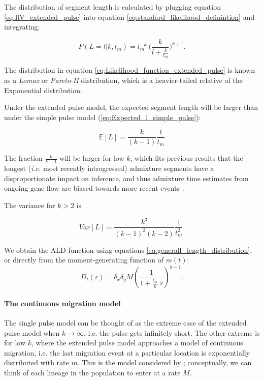 \documentclass[11pt]{article}
\let\oldparagraph\paragraph
\renewcommand{\paragraph}[1]{\oldparagraph{#1}\mbox{}}
\begin{document}
	
The distribution of segment length is calculated by plugging equation \ref{eq:RV_extended_pulse} into  equation  \ref{eq:standard_likelihood_definintion} and integrating:
	
	
\begin{equation}
\label{eq:Likelihood_function_extended_pulse}
	P(L=l | k, t_m) = t_{m}^{-k} \ \Bigg( \frac{k}{l+\frac{k}{t_{m}}}\Bigg)^{k+1}
	\text{.}
\end{equation}
	
The distribution  in equation \ref{eq:Likelihood_function_extended_pulse} is known as a \emph{Lomax} or \emph{Pareto-II} distribution, which is a heavier-tailed relative of the Exponential distribution. 
	
	
Under the extended pulse model, the expected segment length will be larger than under the simple pulse model (\ref{eq:Expected_l_simple_pulse}):
	
\begin{equation}
\label{eq:Expected_l_extended_pulse}
    \mathbb{E}[L] = \frac{k}{(k-1)}\frac{1}{t_{m}}
\end{equation}
	
The fraction $\frac{k}{k-1}$ will be larger for low $k$, which fits previous results that the longest (\emph{i.e.} most recently introgressed) admixture segments have a disproportionate impact on inference, and thus  admixture time estimates from ongoing gene flow are biased towards more recent events \citep{moorjani_history_2011,moorjani_genetic_2016}.
	
The variance for $k>2$ is 
	
\begin{equation}
\label{eq:Var_l_extended_pulse}
	Var[L] = \frac{k^3}{(k-1)^2 (k-2)} \frac{1}{t_m^2}\text{.}
\end{equation}
	
We obtain the ALD-function using equations \ref{eq:generall_length_distribution}, or directly from the moment-generating function of $m(t)$:
\begin{equation}
\label{eq:extended_pulse_tail}
D_t(r) = \delta_x\delta_y M\left( \frac{1}{1 + \frac{t_m}{k} \:r}\right) ^{k-1} \text{.}
\end{equation}

	
\paragraph{The continuous migration model}

The single pulse model can be thought of as the extreme case of the extended pulse model when $k \to \infty$, i.e. the pulse gets infinitely short. The other extreme is for low $k$, where the extended pulse model approaches a model of continuous migration, i.e. the last migration event at a particular location is exponentially distributed with rate $m$. This is the model considered by \cite{pool_inference_2009}; conceptually, we can think of each lineage in the population to enter at a rate $M$. 
	
\end{document}

